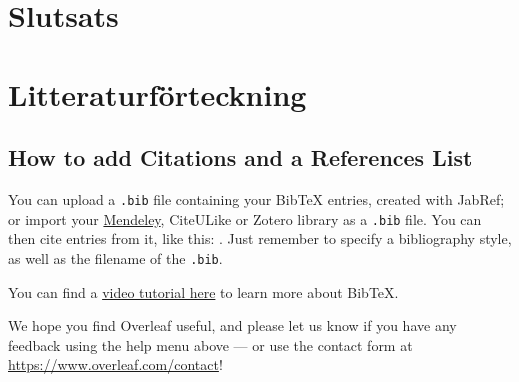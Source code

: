 \documentclass[a4paper]{article}
\begin{document}
\clearpage



\section{Slutsats}

\clearpage



\section{Litteraturförteckning}


\subsection{How to add Citations and a References List}

You can upload a \verb|.bib| file containing your BibTeX entries, created with JabRef; or import your \href{https://www.overleaf.com/blog/184}{Mendeley}, CiteULike or Zotero library as a \verb|.bib| file. You can then cite entries from it, like this: \cite{greenwade93}. Just remember to specify a bibliography style, as well as the filename of the \verb|.bib|.

You can find a \href{https://www.overleaf.com/help/97-how-to-include-a-bibliography-using-bibtex}{video tutorial here} to learn more about BibTeX.

We hope you find Overleaf useful, and please let us know if you have any feedback using the help menu above --- or use the contact form at \url{https://www.overleaf.com/contact}!



\end{document}
